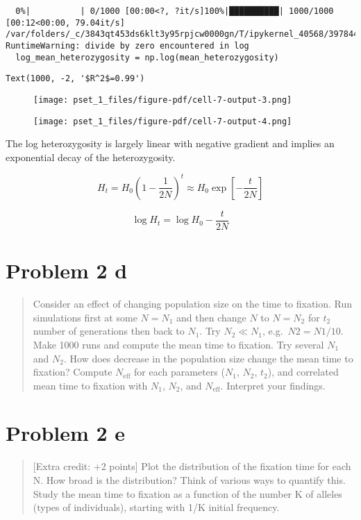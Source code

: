 \documentclass[
  letterpaper,
  DIV=11,
  numbers=noendperiod]{scrartcl}
\begin{document}
\begin{verbatim}
  0%|          | 0/1000 [00:00<?, ?it/s]100%|██████████| 1000/1000 [00:12<00:00, 79.04it/s]
/var/folders/_c/3843qt453ds6klt3y95rpjcw0000gn/T/ipykernel_40568/3978446525.py:15: RuntimeWarning: divide by zero encountered in log
  log_mean_heterozygosity = np.log(mean_heterozygosity)
\end{verbatim}

\begin{verbatim}
Text(1000, -2, '$R^2$=0.99')
\end{verbatim}

\begin{figure}[H]

{\centering \texttt{[image: pset\_1\_files/figure-pdf/cell-7-output-3.png]}

}

\end{figure}

\begin{figure}[H]

{\centering \texttt{[image: pset\_1\_files/figure-pdf/cell-7-output-4.png]}

}

\end{figure}

The log heterozygosity is largely linear with negative gradient and
implies an exponential decay of the heterozygosity.

\[H_{t}=H_0\left(1-\frac{1}{2N}\right)^{t}\approx H_0 \exp\left[{-\frac{t}{2N}}\right]\]

\[\log H_{t}=\log H_0 -\frac{t}{2N}\]

\hypertarget{problem-2-d}{%
\section{Problem 2 d}\label{problem-2-d}}

\begin{quote}
Consider an effect of changing population size on the time to fixation.
Run simulations first at some \(N=N_1\) and then change \(N\) to
\(N=N_2\) for \(t_2\) number of generations then back to \(N_1\). Try
\(N_2\ll N_1\), e.g.~\(N2=N1/10\). Make 1000 runs and compute the mean
time to fixation. Try several \(N_1\) and \(N_2\). How does decrease in
the population size change the mean time to fixation? Compute
\(N_\mathrm{eff}\) for each parameters (\(N_1\), \(N_2\), \(t_2\)), and
correlated mean time to fixation with \(N_1\), \(N_2\), and
\(N_\mathrm{eff}\). Interpret your findings.
\end{quote}

\hypertarget{problem-2-e}{%
\section{Problem 2 e}\label{problem-2-e}}

\begin{quote}
{[}Extra credit: +2 points{]} Plot the distribution of the fixation time
for each N. How broad is the distribution? Think of various ways to
quantify this. Study the mean time to fixation as a function of the
number K of alleles (types of individuals), starting with 1/K initial
frequency.
\end{quote}
\end{document}
